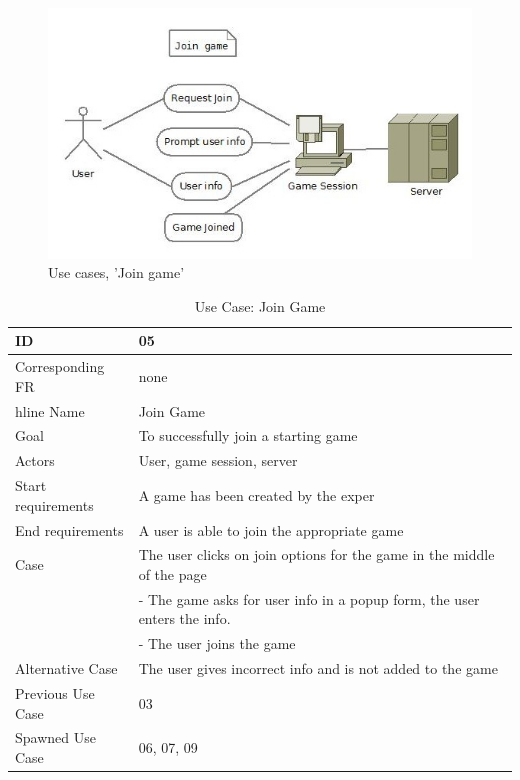 \begin{figure}[H]
  \centering
    \includegraphics[width=1.0\textwidth]{img/joingame.jpg}
  \caption{Use cases, 'Join game'} 
  \label{fig:joingame}
\end{figure}


\begin{table}[H]
\begin{tabular}{|l|p{14cm}|}
\hline
	\textbf{ID} & \textbf{05}\\ \hline
	Corresponding FR & none\\hline
	Name & Join Game\\ \hline
	Goal & To successfully join a starting game\\ \hline
	Actors & User, game session, server \\ \hline
	Start requirements & A game has been created by the exper\\ \hline
	End requirements & A user is able to join the appropriate game\\ \hline
	Case & The user clicks on join options for the game in the middle of the page\\
			& - The game asks for user info in a popup form, the user enters the info. \\
			& - The user joins the game \\ \hline
	Alternative Case & The user gives incorrect info and is not added to the game \\ \hline
	Previous Use Case & 03 \\ \hline
	Spawned Use Case & 06, 07, 09\\ \hline
\end{tabular}
\caption{Use Case: Join Game}
\label{fig:usecase05table}
\end{table}


